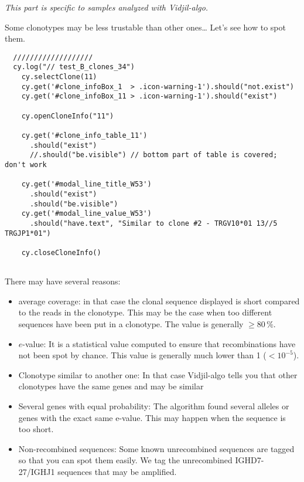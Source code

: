 \bigskip

\textit{This part is specific to samples analyzed with Vidjil-algo.}

Some clonotypes may be less trustable than other ones\dots{} Let's see how to spot them.
\begin{verbatim}
  ///////////////////
  cy.log("// test_B_clones_34")
    cy.selectClone(11)
    cy.get('#clone_infoBox_1  > .icon-warning-1').should("not.exist")
    cy.get('#clone_infoBox_11 > .icon-warning-1').should("exist")

    cy.openCloneInfo("11")

    cy.get('#clone_info_table_11')
      .should("exist")
      //.should("be.visible") // bottom part of table is covered; don't work

    cy.get('#modal_line_title_W53')
      .should("exist")
      .should("be.visible")
    cy.get('#modal_line_value_W53')
      .should("have.text", "Similar to clone #2 - TRGV10*01 13//5 TRGJP1*01")

    cy.closeCloneInfo()


\end{verbatim}

There may have several reasons: 
\begin{itemize}
\item average coverage: in that case the clonal sequence displayed is short
  compared to the reads in the clonotype. This may be the case when too different
  sequences have been put in a clonotype. The value is generally $\geq 80\,\%$.
\item $e$-value: It is a statistical value computed to ensure that
  recombinations have not been spot by chance. This value is generally much
  lower than 1 ($<10^{-5}$).
\item Clonotype similar to another one: In that case Vidjil-algo tells you that
  other clonotypes have the same genes and may be similar
\item Several genes with equal probability: The algorithm found several alleles or genes with the exact same e-value. This may happen when the sequence is too short.
\item Non-recombined sequences: Some known unrecombined sequences are tagged
  so that you can spot them easily. We tag the unrecombined IGHD7-27/IGHJ1
  sequences that may be amplified.
\end{itemize}

